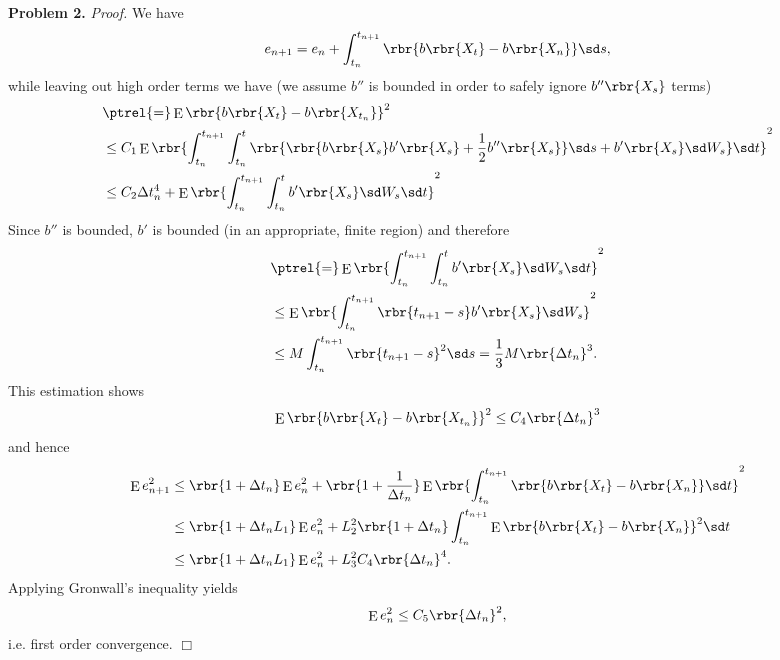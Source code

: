 \documentclass[english, nochinese]{pnote}
\DeclareMathOperator\ope{\mathrm{E}}
\begin{document}
\textbf{Problem 2.} \textit{Proof.} We have
\begin{equation}
e_{ n + 1 } = e_n + \int_{t_n}^{t_{ n + 1 }} \rbr{ b \rbr{X_t} - b \rbr{X_n} } \sd s,
\end{equation}
while leaving out high order terms we have (we assume $b''$ is bounded in order to safely ignore $ b'' \rbr{X_s} $ terms)
\begin{equation}
\begin{split}
&\ptrel{=} \ope \rbr{ b \rbr{X_t} - b \rbr{X_{t_n}} }^2 \\
&\le C_1 \ope \rbr{ \int_{t_n}^{t_{ n + 1 }} \int_{t_n}^t \rbr{ \rbr{ b \rbr{X_s} b' \rbr{X_s} + \frac{1}{2} b'' \rbr{X_s} } \sd s + b' \rbr{X_s} \sd W_s } \sd t }^2 \\
&\le C_2 \Delta t_n^4 + \ope \rbr{ \int_{t_n}^{t_{ n + 1 }} \int_{t_n}^t b' \rbr{X_s} \sd W_s \sd t }^2
\end{split}
\end{equation}
Since $b''$ is bounded, $b'$ is bounded (in an appropriate, finite region) and therefore
\begin{equation}
\begin{split}
&\ptrel{=} \ope \rbr{ \int_{t_n}^{t_{ n + 1 }} \int_{t_n}^t b' \rbr{X_s} \sd W_s \sd t }^2 \\
&\le \ope \rbr{ \int_{t_n}^{t_{ n + 1 }} \rbr{ t_{ n + 1 } - s } b' \rbr{X_s} \sd W_s }^2 \\
&\le M \int_{t_n}^{t_{ n + 1 }} \rbr{ t_{ n + 1 } - s }^2 \sd s = \frac{1}{3} M \rbr{ \Delta t_n }^3.
\end{split}
\end{equation}
This estimation shows
\begin{equation}
\ope \rbr{ b \rbr{X_t} - b \rbr{X_{t_n}} }^2 \le C_4 \rbr{ \Delta t_n }^3
\end{equation}
and hence
\begin{equation}
\begin{split}
\ope e_{ n + 1 }^2 &\le \rbr{ 1 + \Delta t_n } \ope e_n^2 + \rbr{ 1 + \frac{1}{ \Delta t_n } } \ope \rbr{ \int_{t_n}^{t_{ n + 1 }} \rbr{ b \rbr{X_t} - b \rbr{X_n} } \sd t }^2 \\
&\le \rbr{ 1 + \Delta t_n L_1 } \ope e_n^2 + L_2^2 \rbr{ 1 + \Delta t_n } \int_{t_n}^{t_{ n + 1 }} \ope \rbr{ b \rbr{X_t} - b \rbr{X_n} }^2 \sd t \\
&\le \rbr{ 1 + \Delta t_n L_1 } \ope e_n^2 + L_3^2 C_4 \rbr{ \Delta t_n }^4.
\end{split}
\end{equation}
Applying Gronwall’s inequality yields
\begin{equation}
\ope e_n^2 \le C_5 \rbr{ \Delta t_n }^2,
\end{equation}
i.e. first order convergence.
\hfill$\Box$
\end{document}
